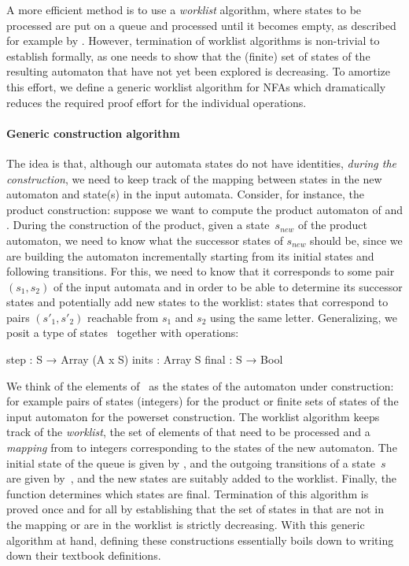 A more efficient method is to use a \emph{worklist} algorithm, where states to
be processed are put on a queue and processed until it becomes empty, as
described for example by \citet{esparza2023automata}.
%
However, termination of worklist algorithms is non-trivial to establish
formally, as one needs to show that the (finite) set of states of the resulting
automaton that have not yet been explored is decreasing.
%
To amortize this effort, we define a generic worklist algorithm for NFAs which
dramatically reduces the required proof effort for the individual operations.

\paragraph{Generic construction algorithm}
The idea is that, although our automata states do not have identities,
\emph{during the construction}, we need to keep track of the mapping between
states in the new automaton and state(s) in the input automata.
%
Consider, for instance, the product construction: suppose we want to compute the
product automaton of  and .
%
During the construction of the product, given a state~$s_{\mathit{new}}$ of the
product automaton, we need to know what the successor states of
$s_{\mathit{new}}$ should be, since we are building the automaton incrementally
starting from its initial states and following transitions.
%
For this, we need to know that it corresponds to some pair $(s_1, s_2)$ of the
input automata  and  in order to be able to
determine its successor states and potentially add new states to the worklist:
states that correspond to pairs $(s'_1, s'_2)$ reachable from $s_1$ and
$s_2$ using the same letter.
%
Generalizing, we posit a type of states~ together with operations:
%
\begin{lean}
  step  : S → Array (A x S)
  inits : Array S
  final : S → Bool
\end{lean}

We think of the elements of~ as the states of the automaton under
construction: for example pairs of states (integers) for the product or finite
sets of states of the input automaton for the powerset construction.
%
The worklist algorithm keeps track of the \emph{worklist}, the set of elements
of  that need to be processed and a \emph{mapping} from
 to integers corresponding to the states of the new automaton.
%
The initial state of the queue is given by , and the outgoing
transitions of a state~$s$ are given by~, and the new states
are suitably added to the worklist. Finally, the  function
determines which states are final.
%
Termination of this algorithm is proved once and for all by establishing that
the set of states in  that are not in the mapping or are in the
worklist is strictly decreasing.
%
With this generic algorithm at hand, defining these constructions essentially
boils down to writing down their textbook definitions.

